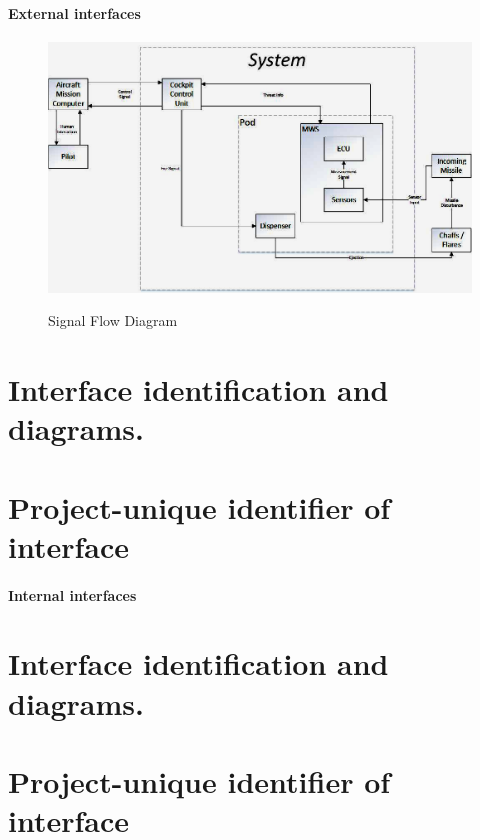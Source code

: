 \subsubsection{External interfaces}
\begin{figure}[h]
	\centering
	\includegraphics[scale=0.5]{./images/SignalFlowDiagram}\\
	\caption{Signal Flow Diagram}
    \label{fig:sigFlowDiagram}
\end{figure}
\chapter{Interface identification and diagrams.}
\chapter{Project-unique identifier of interface}
\subsubsection{Internal interfaces}
\chapter{Interface identification and diagrams.}
\chapter{Project-unique identifier of interface}
